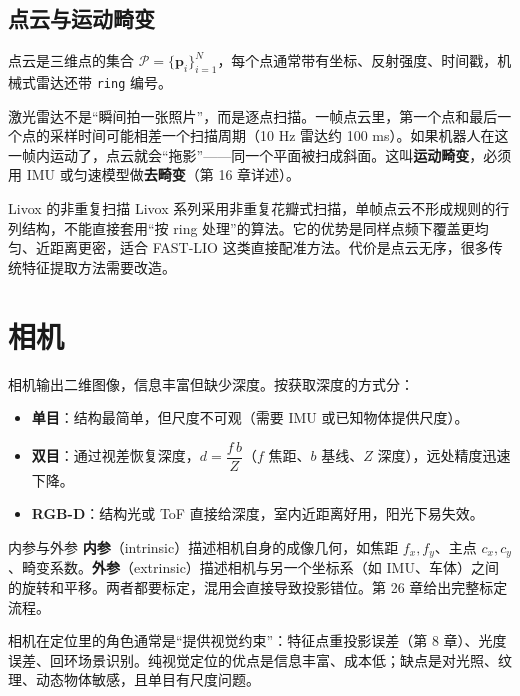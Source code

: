 \subsection{点云与运动畸变}

\begin{definition}[点云]
点云是三维点的集合 $\mathcal{P}=\{\bm{p}_i\}_{i=1}^{N}$，每个点通常带有坐标、反射强度、时间戳，机械式雷达还带 \lstinline{ring} 编号。
\end{definition}

激光雷达不是“瞬间拍一张照片”，而是逐点扫描。一帧点云里，第一个点和最后一个点的采样时间可能相差一个扫描周期（10 Hz 雷达约 100 ms）。如果机器人在这一帧内运动了，点云就会“拖影”——同一个平面被扫成斜面。这叫\textbf{运动畸变}，必须用 IMU 或匀速模型做\textbf{去畸变}（第 16 章详述）。

\begin{keybox}{Livox 的非重复扫描}
Livox 系列采用非重复花瓣式扫描，单帧点云不形成规则的行列结构，不能直接套用“按 ring 处理”的算法。它的优势是同样点频下覆盖更均匀、近距离更密，适合 FAST-LIO 这类直接配准方法。代价是点云无序，很多传统特征提取方法需要改造。
\end{keybox}

\section{相机}\label{sec:03-camera}

相机输出二维图像，信息丰富但缺少深度。按获取深度的方式分：
\begin{itemize}
  \item \textbf{单目}：结构最简单，但尺度不可观（需要 IMU 或已知物体提供尺度）。
  \item \textbf{双目}：通过视差恢复深度，$d=\dfrac{f\,b}{Z}$（$f$ 焦距、$b$ 基线、$Z$ 深度），远处精度迅速下降。
  \item \textbf{RGB-D}：结构光或 ToF 直接给深度，室内近距离好用，阳光下易失效。
\end{itemize}

\begin{keybox}{内参与外参}
\textbf{内参}（intrinsic）描述相机自身的成像几何，如焦距 $f_x,f_y$、主点 $c_x,c_y$、畸变系数。\textbf{外参}（extrinsic）描述相机与另一个坐标系（如 IMU、车体）之间的旋转和平移。两者都要标定，混用会直接导致投影错位。第 26 章给出完整标定流程。
\end{keybox}


相机在定位里的角色通常是“提供视觉约束”：特征点重投影误差（第 8 章）、光度误差、回环场景识别。纯视觉定位的优点是信息丰富、成本低；缺点是对光照、纹理、动态物体敏感，且单目有尺度问题。

